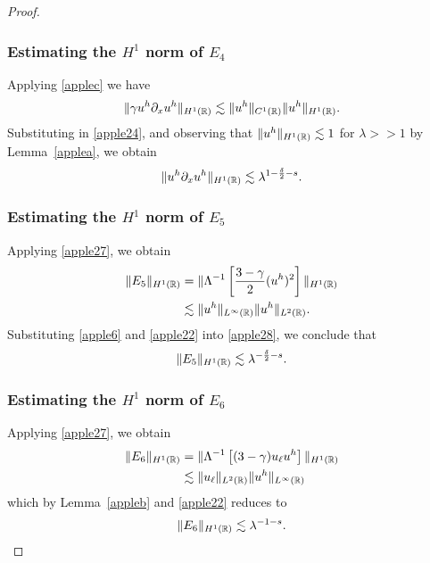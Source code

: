 \begin{proof}
\subsubsection{Estimating the $H^1$ norm of $\hyperref[all_errors_together]{E_4}$} Applying  \eqref{applec} we have
\begin{equation}
	\begin{split}
		\|\gamma u^h \partial_x u^h\|_{H^1(\mathbb{R})} \lesssim \|u^h\|_{C^1(\mathbb{R})}
		\|u^h\|_{H^1(\mathbb{R})}.
		\label{apple25}
	\end{split}
\end{equation}
Substituting in \eqref{apple24}, and observing that $\|u^h\|_{H^1(\mathbb{R})} \lesssim 1$ for $\lambda >>1$ by 
Lemma~\ref{applea}, we obtain
\begin{equation}
	\begin{split}
		\|u^h \partial_x u^h \|_{H^1(\mathbb{R})} \lesssim \lambda^{1-\frac{\delta}{2}-s}.
		\label{apple26}
	\end{split}
\end{equation}
%
%
%
\subsubsection{Estimating the $H^1$ norm of $\hyperref[all_errors_together]{E_5}$}
Applying \eqref{apple27}, we obtain
\begin{equation}
	\begin{split}
		\|E_5\|_{H^1(\mathbb{R})}
		& = \|\Lambda^{-1}\left[ \frac{3-\gamma}{2}(u^h)^2
		\right]\|_{H^1(\mathbb{R})}
		\\
		& \lesssim \|u^h\|_{L^\infty(\mathbb{R})} \|u^h\|_{L^2(\mathbb{R})}.
		\label{apple28}
	\end{split}
\end{equation}
Substituting \eqref{apple6} and \eqref{apple22} into \eqref{apple28}, we conclude that
\begin{equation}
	\begin{split}
		\|E_5\|_{H^1(\mathbb{R})} \lesssim \lambda^{-\frac{\delta}{2}-s}.
		\label{apple29}
	\end{split}
\end{equation}
%
%
%
%
%
\subsubsection{Estimating the $H^1$ norm of $\hyperref[all_errors_together]{E_6}$} Applying \eqref{apple27}, we obtain
\begin{equation}
	\begin{split}
		\|E_6\|_{H^1(\mathbb{R})} 
		& = \|\Lambda^{-1} \left[ (3 -\gamma) u_\ell u^h \right]\|_{H^1(\mathbb{R})}
		\\
		& \lesssim \|u_\ell\|_{L^2(\mathbb{R})} \|u^h\|_{L^\infty(\mathbb{R})}
		\label{apple30}
	\end{split}
\end{equation}
which by Lemma~\ref{appleb} and \eqref{apple22} reduces to
\begin{equation}
	\begin{split}
		\|E_6\|_{H^1(\mathbb{R})} \lesssim \lambda^{-1-s}.
		\label{apple31}
	\end{split}
\end{equation}
%
%
%
%
%

\end{proof}
